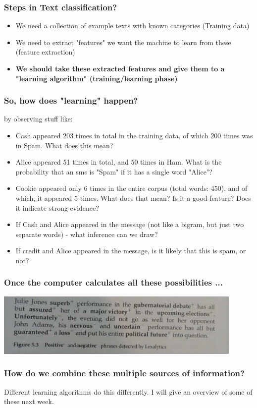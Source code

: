 \documentclass{beamer}
\begin{document}
\begin{frame}
\frametitle{Steps in Text classification?}
\begin{itemize}
\item We need a collection of example texts with known categories (Training data)
\item We need to extract "features" we want the machine to learn from these (feature extraction)
\item \textbf{We should take these extracted features and give them to a "learning algorithm" (training/learning phase)}
\end{itemize}
\end{frame}

\begin{frame}
\frametitle{So, how does "learning" happen?}
by observing stuff like:
\begin{itemize}
\item Cash appeared 203 times in total in the training data, of which 200 times was in Spam. What does this mean? \pause
\item Alice appeared 51 times in total, and 50 times in Ham. What is the probability that an sms is "Spam" if it has a single word "Alice"? \pause
\item Cookie appeared only 6 times in the entire corpus (total words: 450), and of which, it appeared 5 times. What does that mean? Is it a good feature? Does it indicate strong evidence? \pause
\item If Cash and Alice appeared in the message (not like a bigram, but just two separate words) - what inference can we draw? \pause
\item If credit and Alice appeared in the message, is it likely that this is spam, or not? 
\end{itemize}
\end{frame}

\begin{frame}
\frametitle{Once the computer calculates all these possibilities ...}
\includegraphics[width=0.9\textwidth]{classification-example.jpg} 
\end{frame}

\begin{frame}
\frametitle{How do we combine these multiple sources of information?}
Different learning algorithms do this differently. I will give an overview of some of these next week.
\end{frame}
\end{document}
